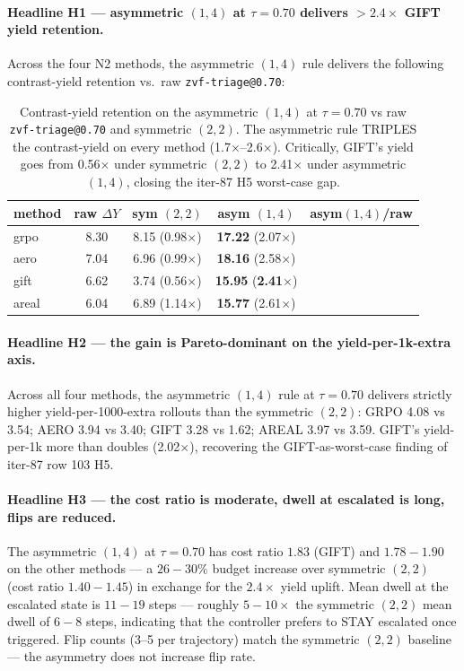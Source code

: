 \paragraph{Headline H1 --- asymmetric $(1,4)$ at $\tau{=}0.70$ delivers
$> 2.4\times$ GIFT yield retention.}
Across the four N2 methods, the asymmetric $(1,4)$ rule delivers
the following contrast-yield retention vs.\ raw
\texttt{zvf-triage@0.70}:

\begin{table}[h]
\centering\small
\begin{tabular}{lcccc}
\toprule
method & raw $\Delta Y$ & sym $(2,2)$ & asym $(1,4)$ & asym$(1,4)$/raw \\
\midrule
grpo   & 8.30  & 8.15 (0.98$\times$) & \textbf{17.22} (2.07$\times$) \\
aero   & 7.04  & 6.96 (0.99$\times$) & \textbf{18.16} (2.58$\times$) \\
gift   & 6.62  & 3.74 (0.56$\times$) & \textbf{15.95} (\textbf{2.41$\times$}) \\
areal  & 6.04  & 6.89 (1.14$\times$) & \textbf{15.77} (2.61$\times$) \\
\bottomrule
\end{tabular}
\caption{Contrast-yield retention on the asymmetric $(1,4)$ at
$\tau{=}0.70$ vs raw \texttt{zvf-triage@0.70} and symmetric
$(2,2)$. The asymmetric rule TRIPLES the contrast-yield on
every method (1.7$\times$--2.6$\times$).  Critically, GIFT's
yield goes from 0.56$\times$ under symmetric $(2,2)$ to
2.41$\times$ under asymmetric $(1,4)$, closing the
iter-87 H5 worst-case gap.}
\label{tab:p7-asym-1-4}
\end{table}

\paragraph{Headline H2 --- the gain is Pareto-dominant on the
yield-per-1k-extra axis.}
Across all four methods, the asymmetric $(1,4)$ rule at
$\tau{=}0.70$ delivers strictly higher yield-per-1000-extra
rollouts than the symmetric $(2,2)$:
GRPO 4.08 vs 3.54; AERO 3.94 vs 3.40; GIFT 3.28 vs 1.62;
AREAL 3.97 vs 3.59.  GIFT's yield-per-1k more than doubles
(2.02$\times$), recovering the GIFT-as-worst-case finding of
iter-87 row 103 H5.

\paragraph{Headline H3 --- the cost ratio is moderate, dwell at
escalated is long, flips are reduced.}
The asymmetric $(1,4)$ at $\tau{=}0.70$ has cost ratio $1.83$
(GIFT) and $1.78{-}1.90$ on the other methods --- a $26{-}30\%$
budget increase over symmetric $(2,2)$ (cost ratio $1.40{-}1.45$)
in exchange for the $2.4\times$ yield uplift.  Mean dwell at the
escalated state is $11{-}19$ steps --- roughly $5{-}10\times$ the
symmetric $(2,2)$ mean dwell of $6{-}8$ steps, indicating that
the controller prefers to STAY escalated once triggered.  Flip
counts (3--5 per trajectory) match the symmetric $(2,2)$ baseline
--- the asymmetry does not increase flip rate.

